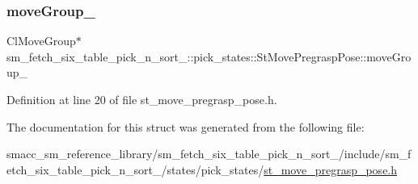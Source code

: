 \subsubsection{\texorpdfstring{move\+Group\+\_\+}{moveGroup\_}}
{\footnotesize\ttfamily Cl\+Move\+Group$\ast$ sm\+\_\+fetch\+\_\+six\+\_\+table\+\_\+pick\+\_\+n\+\_\+sort\+\_\+::pick\+\_\+states\+::\+St\+Move\+Pregrasp\+Pose\+::move\+Group\+\_\+}



Definition at line 20 of file st\+\_\+move\+\_\+pregrasp\+\_\+pose.\+h.



The documentation for this struct was generated from the following file\+:\begin{DoxyCompactItemize}
\item 
smacc\+\_\+sm\+\_\+reference\+\_\+library/sm\+\_\+fetch\+\_\+six\+\_\+table\+\_\+pick\+\_\+n\+\_\+sort\+\_/include/sm\+\_\+fetch\+\_\+six\+\_\+table\+\_\+pick\+\_\+n\+\_\+sort\+\_/states/pick\+\_\+states/\hyperlink{sm__fetch__six__table__pick__n__sort__1_2include_2sm__fetch__six__table__pick__n__sort__1_2stateda93e4da6cde7002c4fdc8b692f4de0c}{st\+\_\+move\+\_\+pregrasp\+\_\+pose.\+h}\end{DoxyCompactItemize}
